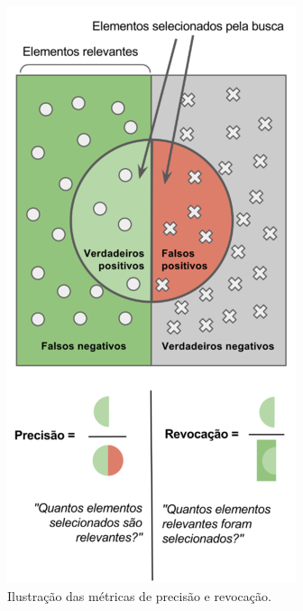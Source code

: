 \begin{figure}[!ht]
    \centering
    \begin{minipage}[c]{0.4\textwidth}
        \includegraphics[width=\columnwidth]{Imagens/Precisão_e_revocação.png}
        \caption{Ilustração das métricas de precisão e revocação.}

\end{minipage}
\end{figure}

